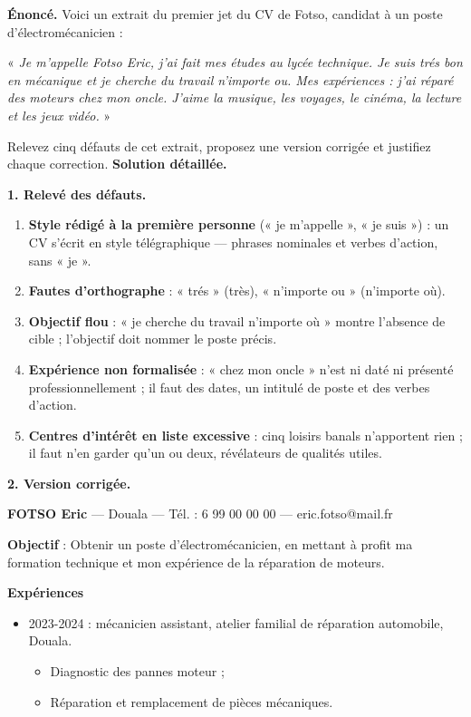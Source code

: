 \documentclass[11pt]{article}
\newcommand{\cle}[1]{{\popxbold\color{popdark}#1}}
\begin{document}
\begin{exoresolu}
\textbf{Énoncé.} Voici un extrait du premier jet du CV de Fotso, candidat à un poste d'électromécanicien :

« \emph{Je m'appelle Fotso Eric, j'ai fait mes études au lycée technique. Je suis trés bon en mécanique et je cherche du travail n'importe ou. Mes expériences : j'ai réparé des moteurs chez mon oncle. J'aime la musique, les voyages, le cinéma, la lecture et les jeux vidéo.} »

Relevez cinq défauts de cet extrait, proposez une version corrigée et justifiez chaque correction.
\tcblower
\textbf{Solution détaillée.}

\textbf{1. Relevé des défauts.}
\begin{enumerate}
\item \textbf{Style rédigé à la première personne} (« je m'appelle », « je suis ») : un CV s'écrit en \cle{style télégraphique} — phrases nominales et verbes d'action, sans « je ».
\item \textbf{Fautes d'orthographe} : « trés » (très), « n'importe ou » (n'importe où).
\item \textbf{Objectif flou} : « je cherche du travail n'importe où » montre l'absence de cible ; l'objectif doit nommer le poste précis.
\item \textbf{Expérience non formalisée} : « chez mon oncle » n'est ni daté ni présenté professionnellement ; il faut des dates, un intitulé de poste et des verbes d'action.
\item \textbf{Centres d'intérêt en liste excessive} : cinq loisirs banals n'apportent rien ; il faut n'en garder qu'un ou deux, révélateurs de qualités utiles.
\end{enumerate}

\textbf{2. Version corrigée.}

\begin{center}
\textbf{FOTSO Eric} — Douala — Tél. : 6 99 00 00 00 — eric.fotso@mail.fr
\end{center}

\textbf{Objectif} : Obtenir un poste d'électromécanicien, en mettant à profit ma formation technique et mon expérience de la réparation de moteurs.

\textbf{Expériences}
\begin{itemize}
\item 2023-2024 : mécanicien assistant, atelier familial de réparation automobile, Douala.
\begin{itemize}
\item Diagnostic des pannes moteur ;
\item Réparation et remplacement de pièces mécaniques.
\end{itemize}
\end{itemize}


\end{exoresolu}
\end{document}
